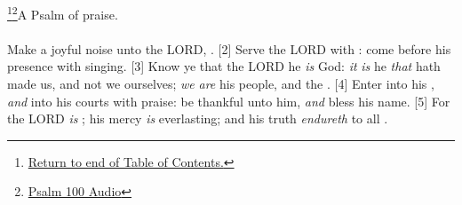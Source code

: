\footnote{\textcolor[rgb]{0.00,0.25,0.00}{\hyperlink{TOC}{Return to end of Table of Contents.}}}\footnote{\href{https://audiobible.com/bible/psalms_100.html}{\textcolor[cmyk]{0.99998,1,0,0}{Psalm 100 Audio}}}\textcolor[cmyk]{0.99998,1,0,0}{A Psalm of praise.}\\
\\
\textcolor[cmyk]{0.99998,1,0,0}{Make a joyful noise unto the LORD, .}
[2] \textcolor[cmyk]{0.99998,1,0,0}{Serve the LORD with : come before his presence with singing.}
[3] \textcolor[cmyk]{0.99998,1,0,0}{Know ye that the LORD he \emph{is} God: \emph{it} \emph{is} he \emph{that} hath made us, and not we ourselves; \emph{we} \emph{are} his people, and the .}
[4] \textcolor[cmyk]{0.99998,1,0,0}{Enter into his , \emph{and} into his courts with praise: be thankful unto him, \emph{and} bless his name.}
[5] \textcolor[cmyk]{0.99998,1,0,0}{For the LORD \emph{is} ; his mercy \emph{is} everlasting; and his truth \emph{endureth} to all .}